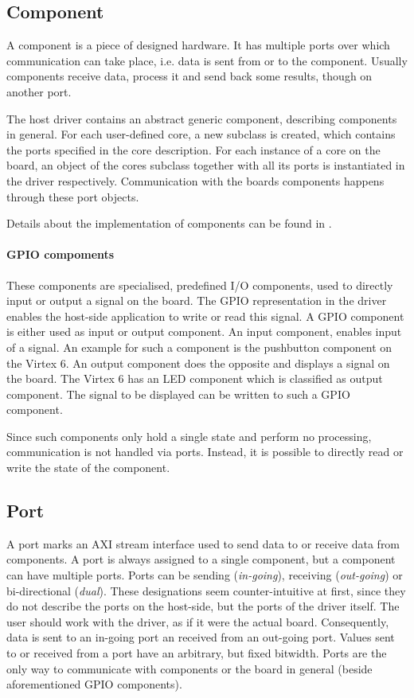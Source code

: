 \documentclass{report}
\begin{document}
\subsection{Component}
\label{sec:api:component}
A component is a piece of designed hardware. It has multiple ports over which communication can take place, i.e. data is sent from or to the component. Usually components receive data, process it and send back some results, though on another port.

The host driver contains an abstract generic component, describing components in general. For each user-defined core, a new subclass is created, which contains the ports specified in the core description. For each instance of a core on the board, an object of the cores subclass together with all its ports is instantiated in the driver respectively. Communication with the boards components happens through these port objects.

Details about the implementation of components can be found in .

\paragraph{GPIO compoments}
These components are specialised, predefined I/O components, used to directly input or output a signal on the board. The GPIO representation in the driver enables the host-side application to write or read this signal. 
A GPIO component is either used as input or output component.
An input component, enables input of a signal. An example for such a component is the pushbutton component on the Virtex 6.
An output component does the opposite and displays a signal on the board. The Virtex 6 has an LED component which is classified as output component. The signal to be displayed can be written to such a GPIO component.

Since such components only hold a single state and perform no processing, communication is not handled via ports. Instead, it is possible to directly read or write the state of the component. 

\subsection{Port}
\label{sec:api:port}
 A port marks an AXI stream interface used to send data to or receive data from components. A port is always assigned to a single component, but a component can have multiple ports. Ports can be sending (\textit{in-going}), receiving (\textit{out-going}) or bi-directional (\textit{dual}). These designations seem counter-intuitive at first, since they do not describe the ports on the host-side, but the ports of the driver itself. The user should work with the driver, as if it were the actual board. Consequently, data is sent to an in-going port an received from an out-going port. Values sent to or received from a port have an arbitrary, but fixed bitwidth. Ports are the only way to communicate with components or the board in general (beside aforementioned GPIO components). 
\end{document}
